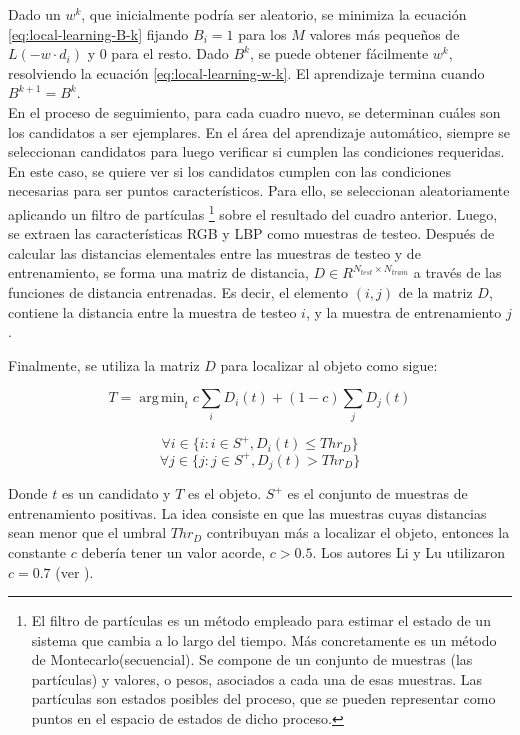 \documentclass[a4paper,10pt]{article}
\DeclareMathOperator*{\argmin}{arg\,min}
\begin{document}
Dado un $w^{k}$, que inicialmente podría ser aleatorio, se minimiza la ecuación
\ref{eq:local-learning-B-k} fijando $B_{i} = 1$ para los $M$ valores más
pequeños de $L(-w \cdot d_{i})$ y $0$ para el resto. Dado $B^{k}$, se puede
obtener fácilmente $w^{k}$, resolviendo la ecuación \ref{eq:local-learning-w-k}.
El aprendizaje termina cuando $B^{k+1}=B^{k}$.\\

En el proceso de seguimiento, para cada cuadro nuevo, se determinan cuáles son los candidatos
a ser ejemplares. En el área del aprendizaje automático, siempre se seleccionan
candidatos para luego verificar si cumplen las condiciones requeridas. En este
caso, se quiere ver si los candidatos cumplen con las condiciones necesarias
para ser puntos característicos. Para ello, se seleccionan
aleatoriamente aplicando un filtro de partículas
\footnote{El filtro de partículas es un método empleado para estimar el estado
  de un sistema que cambia a lo largo del tiempo. Más concretamente es un
  método de Montecarlo(secuencial). Se compone de un conjunto de muestras (las
  partículas) y valores, o pesos, asociados a cada una de esas muestras.
  Las partículas son estados posibles del proceso, que se pueden representar
  como puntos en el espacio de estados de dicho proceso.}
sobre el resultado del cuadro anterior. Luego, se extraen las características
RGB y LBP como muestras de testeo. Después de calcular las distancias
elementales entre las muestras de testeo y de entrenamiento, se forma una
matriz de distancia, $D \in R^{N_{test} \times N_{train}}$ a través de las
funciones de distancia entrenadas. Es decir, el elemento $(i,j)$ de la matriz
$D$, contiene la distancia entre la muestra de testeo $i$, y la muestra de
entrenamiento $j$.

Finalmente, se utiliza la matriz $D$ para localizar al objeto como sigue:

\begin{equation}
    T = \argmin_{t} c \sum_{i} D_{i}(t) + (1 - c) \sum_{j} D_{j}(t)
\end{equation}

\begin{equation}
    \forall i \in \{i : i \in S^{+}, D_{i}(t) \leq Thr_{D} \}
\end{equation}
\begin{equation}
    \forall j \in \{j : j \in S^{+}, D_{j}(t) > Thr_{D} \}
\end{equation}

Donde $t$ es un candidato y $T$ es el objeto. $S^{+}$ es el
conjunto de muestras de entrenamiento positivas. La idea consiste en
que las muestras cuyas distancias sean menor que el umbral $Thr_{D}$
contribuyan más a localizar el objeto, entonces la constante $c$ debería tener
un valor acorde, $c > 0.5$. Los autores Li y Lu utilizaron $c = 0.7$ (ver
\cite{local-learning}).
\end{document}
